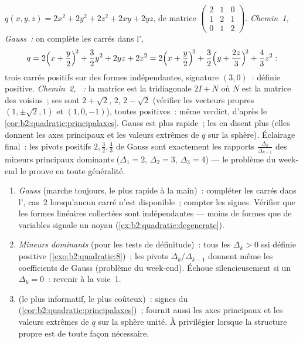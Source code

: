 \begin{example}\label{ex:b2:quadratic:tworoads}
$q(x, y, z) = 2x^2 + 2y^2 + 2z^2 + 2xy + 2yz$, de matrice
$\begin{pmatrix} 2 & 1 & 0\\ 1 & 2 & 1\\ 0 & 1 & 2
\end{pmatrix}$. \emph{Chemin~1, Gauss~:} on complète les carrés dans
l',
\[
q = 2\Bigl(x + \frac y2\Bigr)^{\!2} + \frac32 y^2 + 2yz + 2z^2
= 2\Bigl(x + \frac y2\Bigr)^{\!2}
+ \frac32\Bigl(y + \frac{2z}{3}\Bigr)^{\!2} + \frac43 z^2 :
\]
trois carrés positifs sur des formes indépendantes, signature $(3,
0)$~: définie positive. \emph{Chemin~2, ~:} la
matrice est la tridiagonale $2I + N$ où $N$ est la matrice des
voisins~; ses  sont $2 + \sqrt2$, $2$, $2 - \sqrt2$
(vérifier les vecteurs propres $(1, \pm\sqrt2, 1)$ et $(1, 0, -1)$),
toutes positives~: même verdict, d'après le~
\cref{cor:b2:quadratic:principalaxes}. Gauss est plus rapide~; les
 en disent plus (elles donnent les axes principaux et
les valeurs extrêmes de $q$ sur la sphère). Éclairage final~: les
pivots positifs $2, \frac32, \frac43$ de Gauss sont exactement les
rapports $\frac{\Delta_k}{\Delta_{k-1}}$ des mineurs principaux
dominants ($\Delta_1 = 2$, $\Delta_2 = 3$, $\Delta_3 = 4$) --- le
problème du week-end le prouve en toute généralité.
\end{example}

\begin{method}\label{met:b2:quadratic:signature}
\begin{enumerate}
  \item \emph{Gauss} (marche toujours, le plus rapide à la main)~:
        compléter les carrés dans l', cas~2 lorsqu'aucun carré
        n'est disponible~; compter les signes. Vérifier que les
        formes linéaires collectées sont indépendantes --- moins de
        formes que de variables signale un noyau
        (\cref{ex:b2:quadratic:degenerate}).
  \item \emph{Mineurs dominants} (pour les tests de définitude)~:
        tous les $\Delta_k > 0$ ssi définie positive
        (\cref{exo:b2:quadratic:8})~; les pivots
        $\Delta_k/\Delta_{k-1}$ donnent même les coefficients de
        Gauss (problème du week-end). Échoue silencieusement si un
        $\Delta_k = 0$~: revenir à la voie~1.
  \item \emph{} (le plus informatif, le plus
        coûteux)~: signes du 
        (\cref{cor:b2:quadratic:principalaxes})~; fournit aussi les
        axes principaux et les valeurs extrêmes de $q$ sur la sphère
        unité. À privilégier lorsque la structure propre est de
        toute façon nécessaire.
\end{enumerate}
\end{method}

